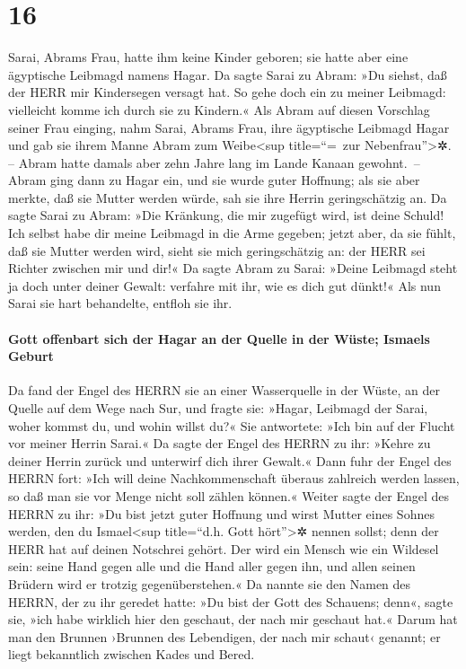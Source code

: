 \hypertarget{section-15}{%
\section{16}\label{section-15}}

 Sarai, Abrams Frau, hatte ihm keine Kinder geboren; sie
hatte aber eine ägyptische Leibmagd namens Hagar.  Da
sagte Sarai zu Abram: »Du siehst, daß der HERR mir Kindersegen versagt
hat. So gehe doch ein zu meiner Leibmagd: vielleicht komme ich durch sie
zu Kindern.« Als Abram auf diesen Vorschlag seiner Frau einging,
 nahm Sarai, Abrams Frau, ihre ägyptische Leibmagd Hagar
und gab sie ihrem Manne Abram zum Weibe\textless sup title=``=~zur
Nebenfrau''\textgreater✲. -- Abram hatte damals aber zehn Jahre lang im
Lande Kanaan gewohnt.~--  Abram ging dann zu Hagar ein,
und sie wurde guter Hoffnung; als sie aber merkte, daß sie Mutter werden
würde, sah sie ihre Herrin geringschätzig an.  Da sagte
Sarai zu Abram: »Die Kränkung, die mir zugefügt wird, ist deine Schuld!
Ich selbst habe dir meine Leibmagd in die Arme gegeben; jetzt aber, da
sie fühlt, daß sie Mutter werden wird, sieht sie mich geringschätzig an:
der HERR sei Richter zwischen mir und dir!«  Da sagte
Abram zu Sarai: »Deine Leibmagd steht ja doch unter deiner Gewalt:
verfahre mit ihr, wie es dich gut dünkt!« Als nun Sarai sie hart
behandelte, entfloh sie ihr.

\hypertarget{gott-offenbart-sich-der-hagar-an-der-quelle-in-der-wuxfcste-ismaels-geburt}{%
\paragraph{Gott offenbart sich der Hagar an der Quelle in der Wüste;
Ismaels
Geburt}\label{gott-offenbart-sich-der-hagar-an-der-quelle-in-der-wuxfcste-ismaels-geburt}}

 Da fand der Engel des HERRN sie an einer Wasserquelle in
der Wüste, an der Quelle auf dem Wege nach Sur,  und
fragte sie: »Hagar, Leibmagd der Sarai, woher kommst du, und wohin
willst du?« Sie antwortete: »Ich bin auf der Flucht vor meiner Herrin
Sarai.«  Da sagte der Engel des HERRN zu ihr: »Kehre zu
deiner Herrin zurück und unterwirf dich ihrer Gewalt.« 
Dann fuhr der Engel des HERRN fort: »Ich will deine Nachkommenschaft
überaus zahlreich werden lassen, so daß man sie vor Menge nicht soll
zählen können.«  Weiter sagte der Engel des HERRN zu ihr:
»Du bist jetzt guter Hoffnung und wirst Mutter eines Sohnes werden, den
du Ismael\textless sup title=``d.h. Gott hört''\textgreater✲ nennen
sollst; denn der HERR hat auf deinen Notschrei gehört. 
Der wird ein Mensch wie ein Wildesel sein: seine Hand gegen alle und die
Hand aller gegen ihn, und allen seinen Brüdern wird er trotzig
gegenüberstehen.«  Da nannte sie den Namen des HERRN, der
zu ihr geredet hatte: »Du bist der Gott des Schauens; denn«, sagte sie,
»ich habe wirklich hier den geschaut, der nach mir geschaut hat.«
 Darum hat man den Brunnen ›Brunnen des Lebendigen, der
nach mir schaut‹ genannt; er liegt bekanntlich zwischen Kades und Bered.

